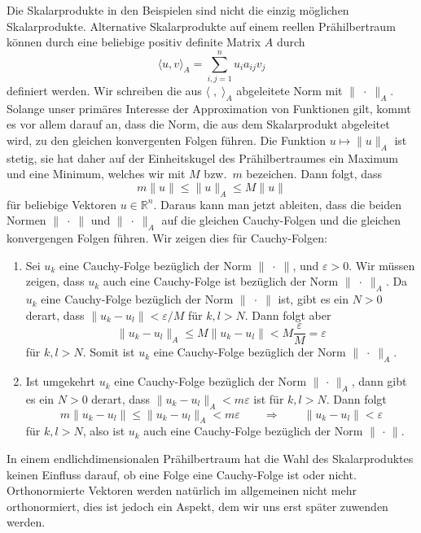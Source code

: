 Die Skalarprodukte in den Beispielen sind nicht die einzig möglichen
Skalarprodukte.
Alternative Skalarprodukte auf einem reellen Prähilbertraum können 
durch eine beliebige positiv definite Matrix $A$ durch
\[
\langle u,v\rangle_A
=
\sum_{i,j=1}^n u_ia_{ij}v_j
\]
definiert werden.
Wir schreiben die aus $\langle\;,\;\rangle_A$ abgeleitete Norm mit
$\|\;\cdot\;\|_A$.
Solange unser primäres Interesse der Approximation von Funktionen gilt,
kommt es vor allem darauf an, dass die Norm, die aus dem Skalarprodukt
abgeleitet wird, zu den gleichen konvergenten Folgen führen.
Die Funktion $u\mapsto \|u\|_A$ ist stetig, sie hat daher auf der
Einheitskugel des Prähilbertraumes ein Maximum und eine Minimum,
welches wir mit $M$ bzw.~$m$ bezeichen.
Dann folgt, dass
\[
m\|u\|\le \|u\|_A\le M\|u\|
\]
für beliebige Vektoren $u\in\mathbb{R}^n$.
Daraus kann man jetzt ableiten, dass die beiden Normen $\|\;\cdot\;\|$
und $\|\;\cdot\;\|_A$ auf die gleichen Cauchy-Folgen und die gleichen
konvergengen Folgen führen.
Wir zeigen dies für Cauchy-Folgen:
\begin{enumerate}
\item
Sei $u_k$ eine Cauchy-Folge bezüglich der Norm $\|\;\cdot\;\|$,
und $\varepsilon>0$.
Wir müssen zeigen, dass $u_k$ auch eine Cauchy-Folge ist bezüglich
der Norm $\|\;\cdot\;\|_A$.
Da $u_k$ eine Cauchy-Folge bezüglich der Norm $\|\;\cdot\;\|$ ist,
gibt es ein $N>0$ derart, dass
$\|u_k-u_l\|<\varepsilon/M$ für $k,l>N$.
Dann folgt aber
\[
\|u_k-u_l\|_A
\le
M\|u_k-u_l\|
<
M\frac{\varepsilon}{M}
=
\varepsilon
\]
für $k,l>N$.
Somit ist $u_k$ eine Cauchy-Folge bezüglich der Norm $\|\;\cdot\;\|_A$.
\item
Ist umgekehrt  $u_k$ eine Cauchy-Folge bezüglich der Norm $\|\,\cdot\,\|_A$,
dann gibt es ein $N>0$ derart, dass $\|u_k-u_l\|_A<m\varepsilon$ ist für
$k,l>N$.
Dann folgt
\[
m\|u_k-u_l\|\le \|u_k-u_l\|_A < m\varepsilon
\qquad\Rightarrow\qquad \|u_k-u_l\|<\varepsilon
\]
für $k,l>N$, also ist $u_k$ auch eine Cauchy-Folge bezüglich der Norm
$\|\,\cdot\,\|$.
\end{enumerate}
In einem endlichdimensionalen Prähilbertraum hat die Wahl des Skalarproduktes
keinen Einfluss darauf, ob eine Folge eine Cauchy-Folge ist oder nicht.
Orthonormierte Vektoren werden natürlich im allgemeinen nicht mehr
orthonormiert, dies ist jedoch ein Aspekt, dem wir uns erst später
zuwenden werden.

%
%

